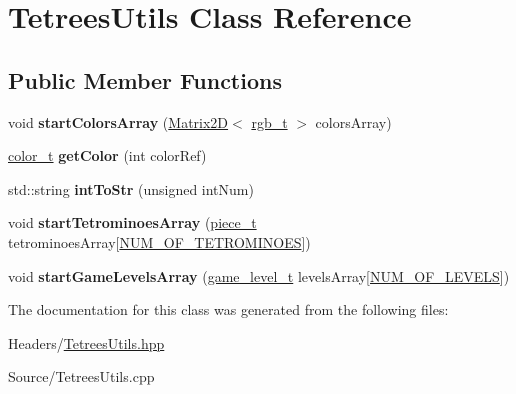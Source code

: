 \hypertarget{classTetreesUtils}{}\section{Tetrees\+Utils Class Reference}
\label{classTetreesUtils}
\subsection*{Public Member Functions}
\begin{DoxyCompactItemize}
\item 
\mbox{\label{classTetreesUtils_afaeab256a68024309eefbbdfae158397}} 
void {\bfseries start\+Colors\+Array} (\hyperlink{classMatrix2D}{Matrix2D}$<$ \hyperlink{structrgb__t}{rgb\+\_\+t} $>$ colors\+Array)
\item 
\mbox{\label{classTetreesUtils_a812d9a7bee07fef5dfcec1fd36c4b502}} 
\hyperlink{TetreesDefs_8hpp_a8ba5fbce2446135735693ab60c896bbd}{color\+\_\+t} {\bfseries get\+Color} (int color\+Ref)
\item 
\mbox{\label{classTetreesUtils_ad6ece1c845969a3535b8a6d971d8ddcb}} 
std\+::string {\bfseries int\+To\+Str} (unsigned int\+Num)
\item 
\mbox{\label{classTetreesUtils_acb377319f6772d9e88f677273c895912}} 
void {\bfseries start\+Tetrominoes\+Array} (\hyperlink{structpiece__t}{piece\+\_\+t} tetrominoes\+Array\mbox{[}\hyperlink{TetreesDefs_8hpp_a69fa4aa1afe74f7f9ec42bf1e07ddf28}{N\+U\+M\+\_\+\+O\+F\+\_\+\+T\+E\+T\+R\+O\+M\+I\+N\+O\+ES}\mbox{]})
\item 
\mbox{\label{classTetreesUtils_a1bbb7dbec571bf3490fd74fcdacc7640}} 
void {\bfseries start\+Game\+Levels\+Array} (\hyperlink{structgame__level__t}{game\+\_\+level\+\_\+t} levels\+Array\mbox{[}\hyperlink{TetreesDefs_8hpp_a350a4204247d3562e237e289533cc31f}{N\+U\+M\+\_\+\+O\+F\+\_\+\+L\+E\+V\+E\+LS}\mbox{]})
\end{DoxyCompactItemize}


The documentation for this class was generated from the following files\+:\begin{DoxyCompactItemize}
\item 
Headers/\hyperlink{TetreesUtils_8hpp}{Tetrees\+Utils.\+hpp}\item 
Source/Tetrees\+Utils.\+cpp\end{DoxyCompactItemize}
